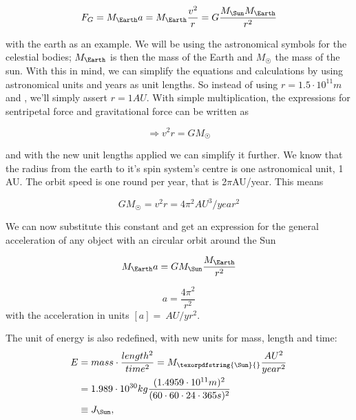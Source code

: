 \documentclass[10pt]{article}
\begin{document}
\begin{multicols}{2}
\begin{equation}
    F_G = M_\Earth a = M_\Earth\frac{v^2}{r} = G\frac{M_\Sun M_\Earth}{r^2}
\end{equation}



with the earth as an example. We will be using the astronomical symbols for
the celestial bodies; $M_\Earth$ is then the mass of the Earth and $M_\Sun$
the mass of the sun. With this in mind, we can simplify the equations and
calculations by using astronomical units and years as unit lengths. So
instead of using $r = 1.5\cdot10^{11}m$ and , we'll simply assert $r =
1AU$. With simple multiplication, the expressions for sentripetal force and
gravitational force can be written as 

\begin{equation}\label{eq:circVel}
    \Rightarrow v^2r = GM_\Sun
\end{equation}

and with the new unit lengths applied we can simplify it further. We know
that the radius from the earth to it's spin system's centre is one
astronomical unit, 1 AU. The orbit speed is one round per year, that is
2$\pi$AU/year. This means

\begin{equation}
    GM_\Sun = v^2r = 4\pi^2AU^3/year^2
\end{equation}

We can now substitute this constant and get an expression for the general
acceleration of any object with an circular orbit around the Sun

\begin{equation}
    M_\Earth a = GM_\Sun\frac{M_\Earth}{r^2}
\end{equation}

\begin{equation}
    a = \frac{4\pi^2}{r^2}
\end{equation}
with the acceleration in units $[a] = \SI{}{AU/yr^2}$. 

The unit of energy is also redefined, with new units for mass, length and time:
\begin{align}
    E &= mass\cdot\frac{length^2}{time^2} = M_\texorpdfstring{\Sun}{}\frac{AU^2}{year^2}\nonumber\\ 
    &= 1.989\cdot10^{30}kg\frac{(1.4959\cdot10^{11}m)^2}{(60\cdot60\cdot24\cdot365s)^2}\nonumber\\
    &\equiv J_\Sun,
\end{align}


\end{multicols}
\end{document}
